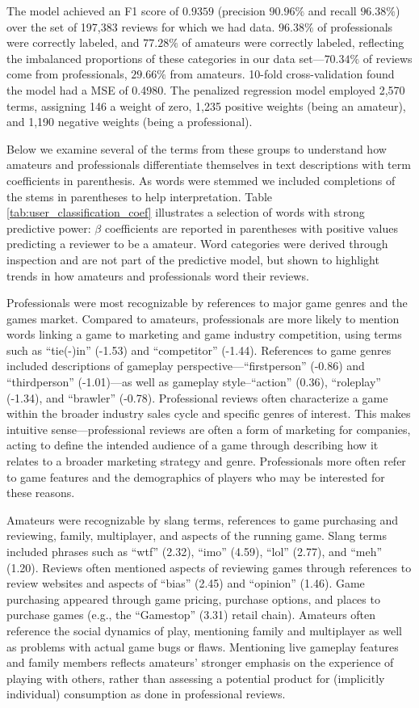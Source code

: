 \documentclass[letterpaper]{article}
\begin{document}
The model achieved an F1 score of $0.9359$ (precision $90.96\%$ and
recall $96.38\%$) over the set of 197,383 reviews for which we had data. $96.38\%$ of professionals were correctly labeled, and $77.28\%$ of amateurs were correctly labeled, reflecting the imbalanced proportions of these categories in our data set---$70.34\%$ of reviews come from professionals, $29.66\%$ from amateurs. 10-fold cross-validation found the model had a MSE of 0.4980. The penalized regression model employed 2,570 terms, assigning 146 a weight of zero, 1,235 positive weights (being an amateur), and 1,190 negative weights (being a professional). 

Below we examine several of the terms from these groups to understand how amateurs and professionals differentiate themselves in text descriptions with term coefficients in parenthesis. As words were stemmed we included completions of the stems in parentheses to help interpretation. Table \ref{tab:user_classification_coef} illustrates a selection of words with strong predictive power: $\beta$ coefficients are reported in parentheses with positive values predicting a reviewer to be a amateur. Word categories were derived through inspection and are not part of the predictive model, but shown to highlight trends in how amateurs and professionals word their reviews. 

Professionals were most recognizable by references to major game genres and the games market. Compared to amateurs, professionals are more likely to mention words linking a game to marketing and game industry competition, using terms such as ``tie(-)in'' (-1.53) and ``competitor'' (-1.44). References to game genres included descriptions of gameplay perspective---``firstperson'' (-0.86) and ``thirdperson'' (-1.01)---as well as gameplay style--``action'' (0.36), ``roleplay'' (-1.34),  and ``brawler'' (-0.78). Professional reviews often characterize a game within the broader industry sales cycle and specific genres of interest. This makes intuitive sense---professional reviews are often a form of marketing for companies, acting to define the intended audience of a game through describing how it relates to a broader marketing strategy and genre. Professionals more often refer to game features and the demographics of players who may be interested for these reasons.

Amateurs were recognizable by slang terms, references to game purchasing and reviewing, family, multiplayer, and aspects of the running game. Slang terms included phrases such as ``wtf'' (2.32), ``imo'' (4.59), ``lol'' (2.77), and ``meh'' (1.20). Reviews often mentioned aspects of reviewing games through references to review websites and aspects of ``bias'' (2.45) and ``opinion'' (1.46). Game purchasing appeared through game pricing, purchase options, and places to purchase games (e.g., the ``Gamestop'' (3.31) retail chain). Amateurs often reference the social dynamics of play, mentioning family and multiplayer as well as problems with actual game bugs or flaws. Mentioning live gameplay features and family members reflects amateurs' stronger emphasis on the experience of playing with others, rather than assessing a potential product for (implicitly individual) consumption as done in professional reviews.
\end{document}
